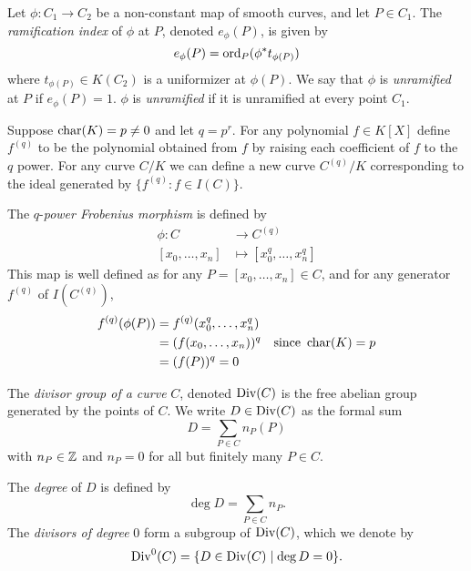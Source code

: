 \begin{definition}
	Let $\phi: C_1 \to C_2$ be a non-constant map of smooth curves, and let
	$P \in C_1$. The \emph{ramification index} of $\phi$ at $P$, denoted
	$e_\phi(P)$, is given by
	\begin{equation*}
		e_\phi(P) = \operatorname{ord}_P(\phi^*t_{\phi(P)})
	\end{equation*}
	where $t_{\phi(P)} \in K(C_2)$ is a uniformizer at $\phi(P)$.
	We say that $\phi$ is \emph{unramified} at $P$ if $e_\phi(P) = 1$. $\phi$ is
	\emph{unramified} if it is unramified at every point $C_1$.
\end{definition}

\begin{definition}
	Suppose $\operatorname{char}(K) = p \neq 0$ and let $q = p^r$.
	For any polynomial $f \in K[X]$ define $f^{(q)}$ to be the polynomial
	obtained from $f$ by raising each coefficient of $f$ to the $q$ power.
	For any curve $C/K$ we can define a new curve $C^{(q)}/K$ corresponding
	to the ideal generated by $\{f^{(q)}: f \in I(C)\}$.
	
	The $q$-\emph{power Frobenius morphism} is defined by
	\begin{align*}
		\phi: C &\to C^{(q)}\\
		[x_0, \dots, x_n] &\mapsto [x_0^q, \dots, x_n^q]
	\end{align*}
	This map is well defined as for any $P = [x_0, \dots, x_n] \in C$, and
	for any generator $f^{(q)}$ of $I(C^{(q)})$,
	\begin{align*}
		f^{(q)}(\phi(P)) &= f^{(q)}(x_0^q, \dots, x_n^q)\\
		&= (f(x_0, \dots, x_n))^q&\textrm{since }\operatorname{char}(K) = p\\
		&= (f(P))^q = 0
	\end{align*}
\end{definition}


\begin{definition}
	The \emph{divisor group of a curve} $C$, denoted $\operatorname{Div}(C)$ is the free
	abelian group generated by the points of $C$. We write $D \in \operatorname{Div}(C)$ as
	the formal sum
	\begin{equation*}
		D = \sum_{P \in C} n_P(P)
	\end{equation*}
	with $n_P \in \mathbb{Z}$ and $n_P = 0$ for all but finitely many $P \in C$.

	The \emph{degree} of $D$ is defined by
	\begin{equation*}
		\deg D = \sum_{P \in C} n_P.
	\end{equation*}
	The \emph{divisors of degree} 0 form a subgroup of $\operatorname{Div}(C)$, which we denote
	by
	\begin{equation*}
		\operatorname{Div}^0(C) = \{D \in \operatorname{Div}(C) \mid \deg D = 0\}.
	\end{equation*}
\end{definition}

